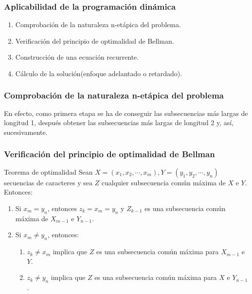 \documentclass[13pt]{beamer}
\begin{document}
    \begin{frame}
		\frametitle{Aplicabilidad de la programación dinámica}
        \begin{enumerate}
            \item Comprobación de la naturaleza n-etápica del problema. 
            \item Verificación del principio de optimalidad de Bellman. 
            \item Construcción de una ecuación recurrente. 
            \item Cálculo de la solución(enfoque adelantado o retardado). 
        \end{enumerate}
	\end{frame}

    \begin{frame}
		\frametitle{Comprobación de la naturaleza n-etápica del problema}
        En efecto, como primera etapa se ha de conseguir las subsecuencias más largas de longitud 1, 
        después obtener las subsecuencias más largas de longitud 2 y, así, sucesivamente. 
	\end{frame}

    \begin{frame}
		\frametitle{Verificación del principio de optimalidad de Bellman}

        \begin{alertblock}{Teorema de optimalidad}
            Sean $X=(x_1,x_2,\cdots, x_m),Y=(y_1,y_2, \cdots, y_n)$ secuencias de caracteres 
            y sea $Z$ cualquier subsecuencia común máxima 
            de $X$ e $Y$. Entonces:
            \begin{enumerate}
              \item Si $x_m = y_n$, entonces $z_k = x_m = y_n$ y $Z_{k-1}$ es una subsecuencia
              común máxima de $X_{m-1}$ e $Y_{n-1}$. 
              \item Si $x_m \neq y_n$, entonces:
              \begin{enumerate}
                \item $z_k \neq x_m$ implica que $Z$ es una subsecuencia común máxima para $X_{m-1}$ e $Y$. 
                \item $z_k \neq y_n$ implica que $Z$ es una subsecuencia común máxima para $X$ e $Y_{n-1}$. 
              \end{enumerate}
            \end{enumerate}
        \end{alertblock}
	\end{frame}
\end{document}
